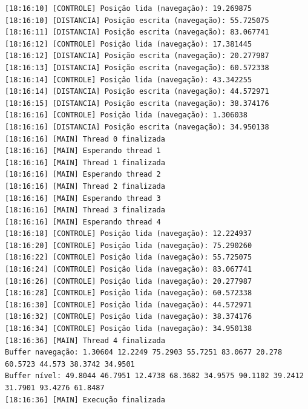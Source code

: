 \documentclass[12pt]{article}
\begin{document}
\begin{verbatim}
[18:16:10] [CONTROLE] Posição lida (navegação): 19.269875
[18:16:10] [DISTANCIA] Posição escrita (navegação): 55.725075
[18:16:11] [DISTANCIA] Posição escrita (navegação): 83.067741
[18:16:12] [CONTROLE] Posição lida (navegação): 17.381445
[18:16:12] [DISTANCIA] Posição escrita (navegação): 20.277987
[18:16:13] [DISTANCIA] Posição escrita (navegação): 60.572338
[18:16:14] [CONTROLE] Posição lida (navegação): 43.342255
[18:16:14] [DISTANCIA] Posição escrita (navegação): 44.572971
[18:16:15] [DISTANCIA] Posição escrita (navegação): 38.374176
[18:16:16] [CONTROLE] Posição lida (navegação): 1.306038
[18:16:16] [DISTANCIA] Posição escrita (navegação): 34.950138
[18:16:16] [MAIN] Thread 0 finalizada
[18:16:16] [MAIN] Esperando thread 1
[18:16:16] [MAIN] Thread 1 finalizada
[18:16:16] [MAIN] Esperando thread 2
[18:16:16] [MAIN] Thread 2 finalizada
[18:16:16] [MAIN] Esperando thread 3
[18:16:16] [MAIN] Thread 3 finalizada
[18:16:16] [MAIN] Esperando thread 4
[18:16:18] [CONTROLE] Posição lida (navegação): 12.224937
[18:16:20] [CONTROLE] Posição lida (navegação): 75.290260
[18:16:22] [CONTROLE] Posição lida (navegação): 55.725075
[18:16:24] [CONTROLE] Posição lida (navegação): 83.067741
[18:16:26] [CONTROLE] Posição lida (navegação): 20.277987
[18:16:28] [CONTROLE] Posição lida (navegação): 60.572338
[18:16:30] [CONTROLE] Posição lida (navegação): 44.572971
[18:16:32] [CONTROLE] Posição lida (navegação): 38.374176
[18:16:34] [CONTROLE] Posição lida (navegação): 34.950138
[18:16:36] [MAIN] Thread 4 finalizada
Buffer navegação: 1.30604 12.2249 75.2903 55.7251 83.0677 20.278 60.5723 44.573 38.3742 34.9501 
Buffer nível: 49.8044 46.7951 12.4738 68.3682 34.9575 90.1102 39.2412 31.7901 93.4276 61.8487 
[18:16:36] [MAIN] Execução finalizada
\end{verbatim}
\end{document}
